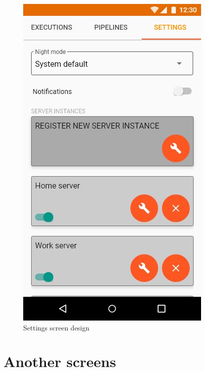 \begin{figure}
\begin{minipage}[b]{0.32\textwidth}
    	\includegraphics[width=\textwidth]{pics/xd/Settings.png}
    	\caption[Settings]{Settings screen design}\label{fig:xdSettings}
    \end{minipage}
\end{figure}

\section{Another screens}

